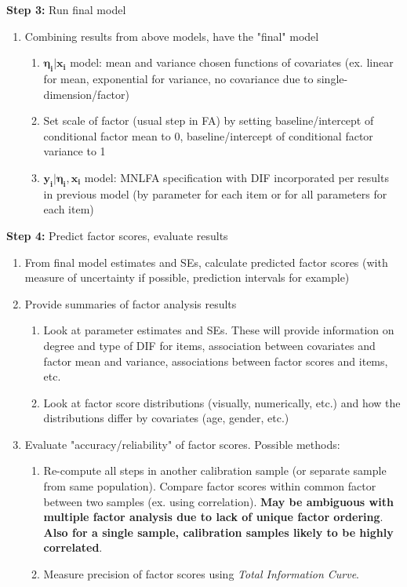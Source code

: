 \documentclass[12pt]{article}
\begin{document}
\noindent \textbf{Step 3:} Run final model
\begin{enumerate}
\item Combining results from above models, have the "final" model
\begin{enumerate}
\item $\boldsymbol{\eta_i}|\boldsymbol{x_i}$ model: mean and variance chosen functions of covariates (ex. linear for mean, exponential for variance, no covariance due to single-dimension/factor)
\item Set scale of factor (usual step in FA) by setting baseline/intercept of conditional factor mean to 0, baseline/intercept of conditional factor variance to 1
\item $\boldsymbol{y_i}|\boldsymbol{\eta_i},\boldsymbol{x_i}$ model: MNLFA specification with DIF incorporated per results in previous model (by parameter for each item or for all parameters for each item)
\end{enumerate}
\end{enumerate}

\noindent \textbf{Step 4:} Predict factor scores, evaluate results
\begin{enumerate}
\item From final model estimates and SEs, calculate predicted factor scores (with measure of uncertainty if possible, prediction intervals for example)
\item Provide summaries of factor analysis results
\begin{enumerate}
\item Look at parameter estimates and SEs.  These will provide information on degree and type of DIF for items, association between covariates and factor mean and variance, associations between factor scores and items, etc.
\item Look at factor score distributions (visually, numerically, etc.) and how the distributions differ by covariates (age, gender, etc.)
\end{enumerate}
\item Evaluate "accuracy/reliability" of factor scores.  Possible methods:
\begin{enumerate}
\item Re-compute all steps in another calibration sample (or separate sample from same population).  Compare factor scores within common factor between two samples (ex. using correlation).  \textbf{May be ambiguous with multiple factor analysis due to lack of unique factor ordering}.  \textbf{Also for a single sample, calibration samples likely to be highly correlated}.
\item Measure precision of factor scores using \textit{Total Information Curve}.
\end{enumerate}
\end{enumerate}
\end{document}
